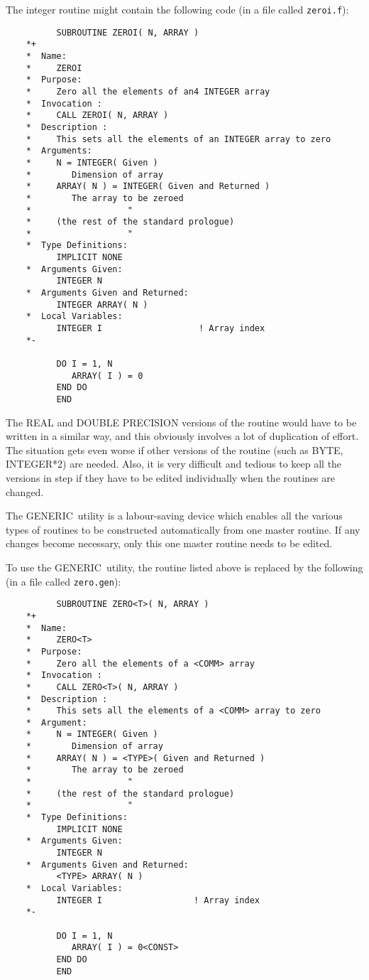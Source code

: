 \documentclass[twoside,11pt]{article}
\renewcommand{\_}{{\tt\char'137}}     %
\newcommand{\GENERIC}{{\footnotesize GENERIC}\normalsize}
\begin{document}
The integer routine might contain the following code (in a file
called {\tt zeroi.f}):

\begin{verbatim}
          SUBROUTINE ZEROI( N, ARRAY )
    *+
    *  Name:
    *     ZEROI
    *  Purpose:
    *     Zero all the elements of an4 INTEGER array
    *  Invocation :
    *     CALL ZEROI( N, ARRAY )
    *  Description :
    *     This sets all the elements of an INTEGER array to zero
    *  Arguments:
    *     N = INTEGER( Given )
    *        Dimension of array
    *     ARRAY( N ) = INTEGER( Given and Returned )
    *        The array to be zeroed
    *                   "
    *     (the rest of the standard prologue)
    *                   "
    *  Type Definitions:
          IMPLICIT NONE
    *  Arguments Given:
          INTEGER N
    *  Arguments Given and Returned:
          INTEGER ARRAY( N )
    *  Local Variables:
          INTEGER I                   ! Array index
    *-
      
          DO I = 1, N      
             ARRAY( I ) = 0
          END DO
          END
\end{verbatim}

The REAL and DOUBLE PRECISION versions of the routine would have to be
written in a similar way, and this obviously involves a lot of 
duplication of effort.
The situation gets even worse if other versions of the routine
(such as BYTE, INTEGER*2) are needed.
Also, it is very difficult and tedious to keep all the versions
in step if they have to be edited individually when the routines
are changed.

The \GENERIC\ utility is a labour-saving device which enables all the
various types of routines to be constructed automatically from
one master routine.
If any changes become necessary, only this one master routine needs
to be edited.

To use the \GENERIC\ utility, the routine listed above is replaced by
the following (in a file called {\tt zero.gen}):

\begin{verbatim}
          SUBROUTINE ZERO<T>( N, ARRAY )
    *+
    *  Name:
    *     ZERO<T>
    *  Purpose:
    *     Zero all the elements of a <COMM> array
    *  Invocation :
    *     CALL ZERO<T>( N, ARRAY )
    *  Description :
    *     This sets all the elements of a <COMM> array to zero
    *  Argument:
    *     N = INTEGER( Given )
    *        Dimension of array
    *     ARRAY( N ) = <TYPE>( Given and Returned )
    *        The array to be zeroed
    *                   "
    *     (the rest of the standard prologue)
    *                   "
    *  Type Definitions:
          IMPLICIT NONE
    *  Arguments Given:
          INTEGER N
    *  Arguments Given and Returned:
          <TYPE> ARRAY( N )
    *  Local Variables:
          INTEGER I                  ! Array index
    *-
      
          DO I = 1, N
             ARRAY( I ) = 0<CONST>
          END DO
          END
\end{verbatim}
\end{document}
